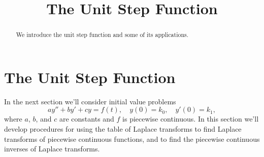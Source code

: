 \documentclass{ximera}
\title{The Unit Step Function}%
\begin{document}
\begin{abstract}
We introduce the unit step function and some of its applications.
\end{abstract}

\maketitle

\section*{The Unit Step Function}

In the next section we'll consider initial value problems
$$
ay''+by'+cy=f(t),\quad y(0)=k_0,\quad y'(0)=k_1,
$$
where $a$, $b$, and $c$ are constants and $f$ is piecewise continuous.
 In this section we'll develop procedures for using the
table of Laplace transforms to find  Laplace transforms of
piecewise continuous functions, and to find the piecewise continuous
inverses of Laplace transforms.
\end{document}
